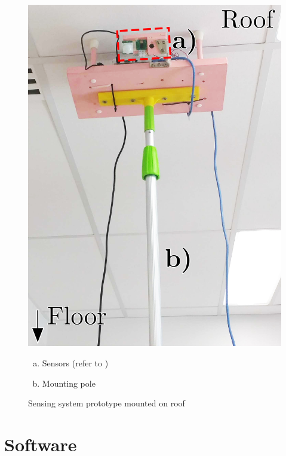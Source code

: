 \documentclass[../thesis/thesis.tex]{subfiles}
\begin{document}
\begin{figure}
\centering
\includegraphics[height=0.7\textheight]{../diagrams/prototype-mounted-ceiling.jpg}
\begin{enumerate}[a)]
 \item Sensors (refer to )
 \item Mounting pole
\end{enumerate}
\caption{Sensing system prototype mounted on roof}
\label{fig:pictures:protoact}
\end{figure}

\clearpage{}

\section{Software}
\end{document}
